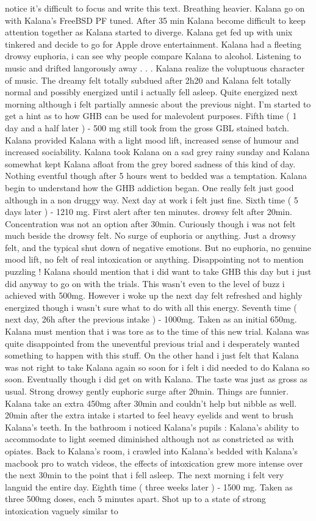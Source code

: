 \documentclass[12pt]{book}
\begin{document}
notice it's difficult to focus and write this text. Breathing heavier. Kalana go on with Kalana's FreeBSD PF tuned. After 35 min Kalana become difficult to keep attention together as Kalana started to diverge. Kalana get fed up with unix tinkered and decide to go for Apple drove entertainment. Kalana had a fleeting drowsy euphoria, i can see why people compare Kalana to alcohol. Listening to music and drifted langorously away . . .  Kalana realize the voluptuous character of music. The dreamy felt totally subdued after 2h20 and Kalana felt totally normal and possibly energized until i actually fell asleep. Quite energized next morning although i felt partially amnesic about the previous night. I'm started to get a hint as to how GHB can be used for malevolent purposes. Fifth time ( 1 day and a half later ) - 500 mg still took from the gross GBL stained batch. Kalana provided Kalana with a light mood lift, increased sense of humour and increased sociability. Kalana took Kalana on a sad grey rainy sunday and Kalana somewhat kept Kalana afloat from the grey bored sadness of this kind of day. Nothing eventful though after 5 hours went to bedded was a temptation. Kalana begin to understand how the GHB addiction began. One really felt just good although in a non druggy way. Next day at work i felt just fine. Sixth time ( 5 days later ) - 1210 mg. First alert after ten minutes. drowsy felt after 20min. Concentration was not an option after 30min. Curiously though i was not felt much beside the drowsy felt. No surge of euphoria or anything. Just a drowsy felt, and the typical shut down of negative emotions. But no euphoria, no genuine mood lift, no felt of real intoxication or anything. Disappointing not to mention puzzling ! Kalana should mention that i did want to take GHB this day but i just did anyway to go on with the trials. This wasn't even to the level of buzz i achieved with 500mg. However i woke up the next day felt refreshed and highly energized though i wasn't sure what to do with all this energy. Seventh time ( next day, 26h after the previous intake ) - 1000mg. Taken as an initial 650mg. Kalana must mention that i was tore as to the time of this new trial. Kalana was quite disappointed from the uneventful previous trial and i desperately wanted something to happen with this stuff. On the other hand i just felt that Kalana was not right to take Kalana again so soon for i felt i did needed to do Kalana so soon. Eventually though i did get on with Kalana. The taste was just as gross as usual. Strong drowsy gently euphoric surge after 20min. Things are funnier. Kalana take an extra 450mg after 30min and couldn't help but nibble as well. 20min after the extra intake i started to feel heavy eyelids and went to brush Kalana's teeth. In the bathroom i noticed Kalana's pupils : Kalana's ability to accommodate to light seemed diminished although not as constricted as with opiates. Back to Kalana's room, i crawled into Kalana's bedded with Kalana's macbook pro to watch videos, the effects of intoxication grew more intense over the next 30min to the point that i fell asleep. The next morning i felt very languid the entire day. Eighth time ( three weeks later ) - 1500 mg. Taken as three 500mg doses, each 5 minutes apart. Shot up to a state of strong intoxication vaguely similar to 
\end{document}
